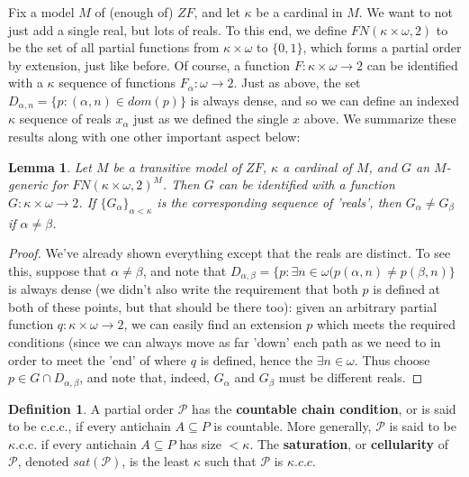 \documentclass{article}
\theoremstyle{definition}
\newtheorem{definition}{Definition}[section]
\theoremstyle{plain}
\theoremstyle{theorem}
\newtheorem{lemma}{Lemma}[section]
\begin{document}
Fix a model $M$ of (enough of) $ZF$, and let $\kappa$ be a cardinal in $M$. We want to not just add a single real, but lots of reals. To this end, we define $FN(\kappa \times \omega,2)$ to be the set of all partial functions from $\kappa \times \omega$ to $\{0,1\}$, which forms a partial order by extension, just like before. Of course, a function $F:\kappa \times \omega \to 2$ can be identified with a $\kappa$ sequence of functions $F_{\alpha}: \omega \to 2$. Just as above, the set $D_{\alpha,n} = \{p: (\alpha,n) \in dom(p)\}$ is always dense, and so we can define an indexed $\kappa$ sequence of reals $x_{\alpha}$ just as we defined the single $x$ above. We summarize these results along with one other important aspect below:
\begin{lemma}
	Let $M$ be a transitive model of $ZF$, $\kappa$ a cardinal of $M$, and $G$ an $M$-generic for $FN(\kappa \times \omega,2)^M$. Then $G$ can be identified with a function $G:\kappa \times \omega \to 2$. If $\{G_{\alpha}\}_{\alpha < \kappa}$ is the corresponding sequence of 'reals', then $G_{\alpha} \neq G_{\beta}$ if $\alpha \neq \beta$.  
\end{lemma} 
\begin{proof}
	We've already shown everything except that the reals are distinct. To see this, suppose that $\alpha \neq \beta$, and note that $D_{\alpha,\beta} = \{p: \exists n \in \omega (p(\alpha,n) \neq p(\beta,n)\}$ is always dense (we didn't also write the requirement that both $p$ is defined at both of these points, but that should be there too): given an arbitrary partial function $q: \kappa \times \omega \to 2$, we can easily find an extension $p$ which meets the required conditions (since we can always move as far 'down' each path as we need to in order to meet the 'end' of where $q$ is defined, hence the $\exists n \in \omega$. Thus choose $p \in G \cap D_{\alpha,\beta}$, and note that, indeed, $G_{\alpha}$ and $G_{\beta}$ must be different reals. 
\end{proof}
\begin{definition}
	A partial order $\mathcal{P}$ has the \textbf{countable chain condition}, or is said to be c.c.c., if every antichain $A \subseteq P$ is countable. More generally, $\mathcal{P}$ is said to be $\kappa$.c.c. if every antichain $A \subseteq P$ has size $<\kappa$. The \textbf{saturation}, or \textbf{cellularity} of $\mathcal{P}$, denoted $sat(\mathcal{P})$, is the least $\kappa$ such that $\mathcal{P}$ is $\kappa.c.c$. 
\end{definition}
\end{document}
